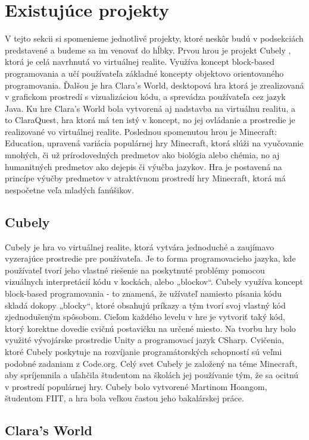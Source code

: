 \documentclass[10pt,twoside,slovak,a4paper]{article}
\begin{document}
\section{Existujúce projekty}
V tejto sekcii si spomenieme jednotlivé projekty, ktoré neskôr budú v podsekciách predstavené a budeme sa im venovať do hĺbky. Prvou hrou je projekt Cubely \cite{Cubely}, ktorá je celá navrhnutá vo virtuálnej realite. Využíva koncept block-based programovania a učí používateľa základné koncepty objektovo orientovaného programovania. Ďalšou je hra Clara's World, desktopová hra ktorá je zrealizovaná v grafickom prostredí s vizualizáciou kódu, a sprevádza používateľa cez jazyk Java. Ku hre Clara's World bola vytvorená aj nadstavba na virtuálnu realitu, a to ClaraQuest, hra ktorá má ten istý v koncept, no jej ovládanie a prostredie je realizované vo virtuálnej realite. Poslednou spomenutou hrou je Minecraft: Education, upravená variácia populárnej hry Minecraft, ktorá slúži na vyučovanie mnohých, či už prírodovedných predmetov ako biológia alebo chémia, no aj humanitných predmetov ako dejepis či výučba jazykov. Hra je postavená na princípe výučby predmetov v atraktívnom prostredí hry Minecraft, ktorá má nespočetne veľa mladých fanúšikov.

\subsection{Cubely}
 Cubely je hra vo virtuálnej realite, ktorá vytvára jednoduché a zaujímavo vyzerajúce prostredie pre používateľa. Je to forma programovacieho jazyka, kde používateľ tvorí jeho vlastné riešenie na poskytnuté problémy pomocou vizuálnych interpretácií kódu v kockách, alebo „blockov“. Cubely využíva koncept block-based programovania - to znamená, že užívateľ namiesto písania kódu skladá dokopy „blocky“, ktoré obsahujú príkazy a tým tvorí svoj vlastný kód zjednodušeným spôsobom. Cieľom každého levelu v hre je vytvoriť taký kód, ktorý korektne dovedie cvičnú postavičku na určené miesto. Na tvorbu hry bolo využité vývojárske prostredie Unity a programovací jazyk CSharp. Cvičenia, ktoré Cubely poskytuje na rozvíjanie programátorských schopností sú veľmi podobné zadaniam z Code.org. Celý svet Cubely je založený na téme Minecraft, aby spríjemnila a uľahčila študentom na školách jej používanie tým, že sa ocitnú v prostredí populárnej hry. Cubely bolo vytvorené Martinom Hoangom, študentom FIIT, a hra bola veľkou častou jeho bakalárskej práce.

\subsection{Clara's World}
\end{document}
